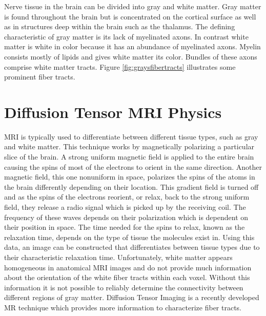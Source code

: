 Nerve tissue in the brain can be divided into gray and white matter.  Gray matter is found throughout the brain but is concentrated on the cortical surface as well as in structures deep within the brain such as the thalamus.  The defining characteristic of gray matter is its lack of myelinated axons.  In contrast white matter is white in color because it has an abundance of myelinated axons.  Myelin consists mostly of lipids and gives white matter its color.  Bundles of these axons comprise white matter tracts. Figure \ref{fig:graysfibertracts} illustrates some prominent fiber tracts.

\section{Diffusion Tensor MRI Physics}

MRI is typically used to differentiate between different tissue types, such as gray and white matter.  This technique works by magnetically polarizing a particular slice of the brain.  A strong uniform magnetic field is applied to the entire brain causing the spins of most of the electrons to orient in the same direction.  Another magnetic field, this one nonuniform in space, polarizes the spins of the atoms in the brain differently depending on their location.  This gradient field is turned off and as the spins of the electrons reorient, or relax, back to the strong uniform field, they release a radio signal which is picked up by the receiving coil.  The frequency of these waves depends on their polarization which is dependent on their position in space.  The time needed for the spins to relax, known as the relaxation time, depends on the type of tissue the molecules exist in.  Using this data, an image can be constructed that differentiates between tissue types due to their characteristic relaxation time. Unfortunately, white matter appears homogeneous in anatomical MRI images and do not provide much information about the orientation of the white fiber tracts within each voxel.  Without this information it is not possible to reliably determine the connectivity between different regions of gray matter.  Diffusion Tensor Imaging is a recently developed MR technique which provides more information to characterize fiber tracts.

